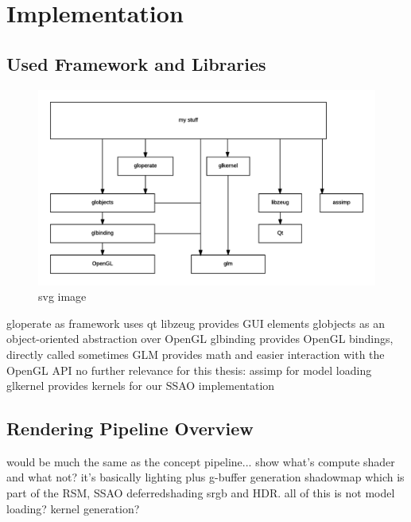 

\chapter{Implementation}
\label{chap:implementation}

\section{Used Framework and Libraries}

\begin{figure}[htbp]
  \centering
  \includegraphics{graphics/Architecture}
  \caption{svg image}
\end{figure}

\begin{outline}
\1 gloperate as framework
    \2 uses qt
\1 libzeug provides GUI elements
\1 globjects as an object-oriented abstraction over OpenGL
\1 glbinding provides OpenGL bindings, directly called sometimes
\1 GLM provides math and easier interaction with the OpenGL API
\1 no further relevance for this thesis:
    \2 assimp for model loading
    \2 glkernel provides kernels for our SSAO implementation
\end{outline}

\section{Rendering Pipeline Overview}
\begin{outline}
\1 would be much the same as the concept pipeline...
\1 show what's compute shader and what not?
\1 it's basically lighting plus
    \2 g-buffer generation
    \2 shadowmap which is part of the RSM,
    \2 SSAO
    \2 deferredshading
    \2 srgb and HDR.
    \2 all of this is not
\1 model loading?
\1 kernel generation?
\end{outline}


